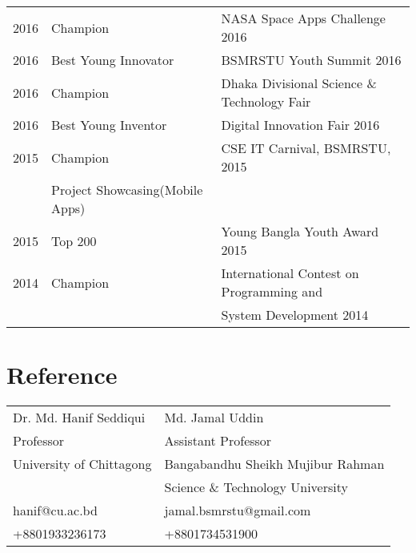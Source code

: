 \documentclass[]{deedy-resume-openfont}
\begin{document}
\begin{minipage}[t]{0.66\textwidth}
\begin{tabular}{rll}
2016     & Champion & NASA Space Apps Challenge 2016 \\
 2016     & Best Young Innovator & BSMRSTU Youth Summit 2016 \\
 2016     & Champion & Dhaka Divisional Science \& Technology Fair\\
 2016	     & Best Young Inventor  & Digital Innovation Fair 2016\\
 2015	     & Champion  & CSE IT Carnival, BSMRSTU, 2015\\
 & Project Showcasing(Mobile Apps) & \\
 2015	     & Top 200  & Young Bangla Youth Award 2015\\
 2014	     & Champion  & International Contest on Programming and\\
 & & System Development 2014\\

\end{tabular}
\sectionsep





\section{Reference} 

\begin{tabular}{ll}
Dr. Md. Hanif Seddiqui    & Md. Jamal Uddin\\
Professor   & Assistant Professor\\
University of Chittagong  & Bangabandhu Sheikh Mujibur Rahman \\
& Science \& Technology University\\
hanif@cu.ac.bd   & jamal.bsmrstu@gmail.com\\
+8801933236173 &+8801734531900\\
\end{tabular}
\sectionsep


%

\end{minipage} 
\end{document}
